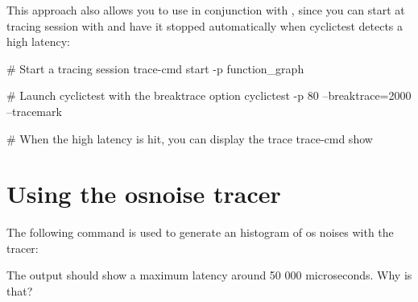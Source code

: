 This approach also allows you to use  in conjunction with ,
since you can start at tracing session with  and have it
stopped automatically when cyclictest detects a high latency:

\begin{bashinput}
	# Start a tracing session
	trace-cmd start -p function_graph

	# Launch cyclictest with the breaktrace option
	cyclictest -p 80 --breaktrace=2000 --tracemark

	# When the high latency is hit, you can display the trace
	trace-cmd show
\end{bashinput}

\section{Using the osnoise tracer}

The following command is used to generate an histogram of os noises with the 
 tracer:


The output should show a maximum latency around 50 000 microseconds. Why is that?


